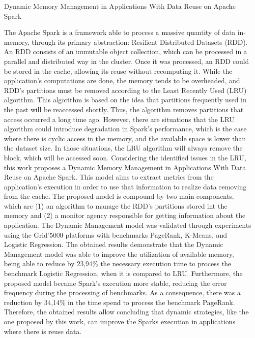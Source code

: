 \documentclass[diss]{mdtufsm}
\begin{document}
\begin{englishabstract}
{Dynamic Memory Management in Applications With Data Reuse on Apache Spark}
\ %
\ %
\ %

\begin{justify}
The Apache Spark is a framework able to process a massive quantity of data in-memory, through its primary abstraction: Resilient Distributed Datasets (RDD). An RDD consists of an immutable object collection, which can be processed in a parallel and distributed way in the cluster. Once it was processed, an RDD could be stored in the cache, allowing its reuse without recomputing it. While the application's computations are done, the memory tends to be overheaded, and RDD's partitions must be removed according to the Least Recently Used (LRU) algorithm. This algorithm is based on the idea that partitions frequently used in the past will be reaccessed shortly. Thus, the algorithm removes partitions that access occurred a long time ago. However, there are situations that the LRU algorithm could introduce degradation in Spark's performance, which is the case where there is cyclic access in the memory, and the available space is lower than the dataset size. In those situations, the LRU algorithm will always remove the block, which will be accessed soon. Considering the identified issues in the LRU, this work proposes a Dynamic Memory Management in Applications With Data Reuse on Apache Spark. This model aims to extract metrics from the application's execution in order to use that information to realize data removing from the cache. The proposed model is compound by two main components, which are (1) an algorithm to manage the RDD's partitions stored int the memory and (2) a monitor agency responsible for getting information about the application. The Dynamic Management model was validated through experiments using the Grid'5000 platforms with benchmarks PageRank, K-Means, and Logistic Regression. The obtained results demonstrate that the Dynamic Management model was able to improve the utilization of available memory, being able to reduce by 23,94\% the necessary execution time to process the benchmark Logistic Regression, when it is compared to LRU.
Furthermore, the proposed model became Spark's execution more stable, reducing the error frequency during the processing of benchmarks. As a consequence, there was a reduction by 34,14\% in the time spend to process the benchmark PageRank. Therefore, the obtained results allow concluding that dynamic strategies, like the one proposed by this work, can improve the Sparks execution in applications where there is reuse data.
\end{justify}
\end{englishabstract}
\end{document}
